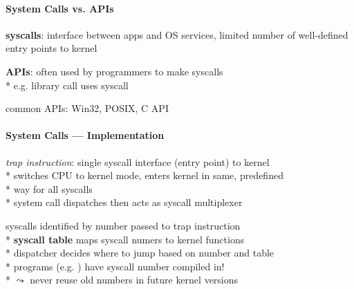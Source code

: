 \paragraph{System Calls vs. APIs}
\begin{items}
	\item \textbf{syscalls}: interface between apps and OS services, limited number of well-defined entry points to kernel
	\item \textbf{APIs}: often used by programmers to make syscalls \\*
		e.g.  library call uses  syscall
	\item common APIs: Win32, POSIX, C API
\end{items}

\paragraph{System Calls --- Implementation}
\begin{items}
	\item \emph{trap instruction}: single syscall interface (entry point) to kernel \\*
		switches CPU to kernel mode, enters kernel in same, predefined \\* \phantom{x} way for all syscalls \\*
		system call dispatches then acts as syscall multiplexer
	\item syscalls identified by number passed to trap instruction \\*
		\textbf{syscall table} maps syscall numers to kernel functions \\*
		dispatcher decides where to jump based on number and table \\*
		programs (e.g. ) have syscall number compiled in! \\*
		\( \leadsto \) never reuse old numbers in future kernel versions
\end{items}

